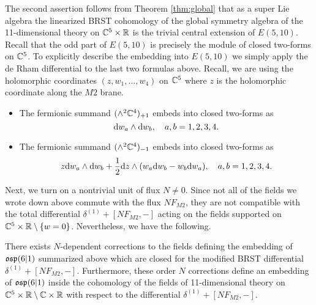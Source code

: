 The second assertion follows from Theorem \ref{thm:global} that as a super Lie algebra the linearized BRST cohomology of the global symmetry algebra of the 11-dimensional theory on $\mathbb C^5 \times \mathbb R$ is the trivial central extension of $E(5,10)$. 
Recall that the odd part of $E(5,10)$ is precisely the module of closed two-forms on $\mathbb C^5$. 
To explicitly describe the embedding into $E(5,10)$ we simply apply the de Rham differential to the last two formulas above.
Recall, we are using the holomorphic coordinates $(z,w_1,\ldots,w_4)$ on $\mathbb C^5$ where $z$ is the holomorphic coordinate along the $M2$ brane. 
\begin{itemize}
\item 
The fermionic summand $(\wedge^2 \mathbb C^4)_{+1}$ embeds into closed two-forms as
\[
{\rm d} w_a \wedge {\rm d} w_b, \quad a,b=1,2,3,4. 
\] 
\item The fermionic summand $(\wedge^2 \mathbb C^4)_{-1}$ embeds into closed two-forms as
\[
z {\rm d} w_a  \wedge {\rm d} w_b + \frac12 {\rm d} z \wedge (w_a {\rm d} w_b - w_b {\rm d} w_a) , \quad a,b=1,2,3,4. 
\] 
\end{itemize}

\parsec[]

Next, we turn on a nontrivial unit of flux $N \ne 0$. 
Since not all of the fields we wrote down above commute with the flux $N F_{M2}$, they are not compatible with the total differential $\delta^{(1)} + [N F_{M2}, -]$ acting on the fields supported on $\mathbb C^5 \times \mathbb R \setminus \{w=0\}$. 
Nevertheless, we have the following. 

\begin{prop}
\label{prop:brads4}
There exists $N$-dependent corrections to the fields defining the embedding of $\mathfrak{osp}(6|1)$ summarized above which are closed for the modified BRST differential $\delta^{(1)} + [N F_{M2},-]$. 
Furthermore, these order $N$ corrections define an embedding of $\mathfrak{osp}(6|1)$ inside the cohomology of the fields of 11-dimensional theory on $\mathbb C^5 \times \mathbb R \setminus \mathbb C \times \mathbb R$ with respect to the differential $\delta^{(1)} + [N F_{M2},-]$.
\end{prop}

